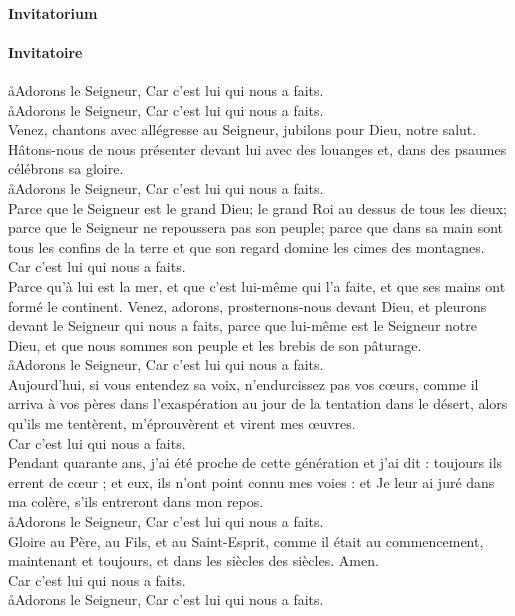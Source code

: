 \documentclass[twoside]{article}
\begin{document}
\begin{paracol}[1]{2}
\switchcolumn*

\paragraph{Invitatorium}


\switchcolumn

\paragraph{Invitatoire}

\aa Adorons le Seigneur, \GreSpecial{*} Car c'est lui qui nous a faits.\\
\aa Adorons le Seigneur, \GreSpecial{*} Car c'est lui qui nous a faits.\\
\vv Venez, chantons avec allégresse au Seigneur, jubilons pour Dieu, notre salut. Hâtons-nous de nous présenter devant lui avec des louanges et, dans des psaumes célébrons sa gloire.\\
\newpage
\aa Adorons le Seigneur, \GreSpecial{*} Car c'est lui qui nous a faits.\\
\vv Parce que le Seigneur est le grand Dieu; le grand Roi au dessus de tous les dieux; parce que le Seigneur ne repoussera pas son peuple; parce que dans sa main sont tous les confins de la terre et que son regard domine les cimes des montagnes.\\
\GreSpecial{*} Car c'est lui qui nous a faits.\\
\vv Parce qu'à lui est la mer, et que c'est lui-même qui l'a faite, et que ses mains ont formé le continent.  Venez, adorons, prosternons-nous devant Dieu, et pleurons devant le Seigneur qui nous a faits,  parce que lui-même est le Seigneur notre Dieu, et que nous sommes son peuple et les brebis de son pâturage.\\
\newpage
\aa Adorons le Seigneur, \GreSpecial{*} Car c'est lui qui nous a faits.\\
\vv Aujourd'hui, si vous entendez sa voix, n'endurcissez pas vos cœurs, comme il arriva à vos pères dans l'exaspération au jour de la tentation dans le désert, alors qu'ils me tentèrent, m'éprouvèrent et virent mes œuvres.\\
\GreSpecial{*} Car c'est lui qui nous a faits.\\
\vv Pendant quarante ans, j'ai été proche de cette génération et j'ai dit : toujours ils errent de cœur ; et eux, ils n'ont point connu mes voies : et Je leur ai juré dans ma colère, s'ils entreront dans mon repos.\\
\aa Adorons le Seigneur, \GreSpecial{*} Car c'est lui qui nous a faits.\\
\vv Gloire au Père, au Fils, et au Saint-Esprit, comme il était au commencement, maintenant et toujours, et dans les siècles des siècles. Amen.\\
\GreSpecial{*} Car c'est lui qui nous a faits.\\
\aa Adorons le Seigneur, \GreSpecial{*} Car c'est lui qui nous a faits.\\


\end{paracol}
\end{document}
